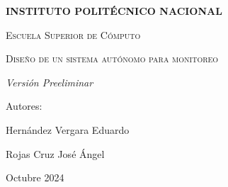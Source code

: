 \begin{titlepage}
\begin{figure}[ht!]
\begin{minipage}{0.2\textwidth}
        \end{minipage}
    \end{figure}
    \centering
    \vspace{1cm}
    {\bfseries\LARGE INSTITUTO POLIT\'ECNICO NACIONAL \par}
    \vspace{1cm}
    {\scshape\Large Escuela Superior de C\'omputo \par}
    \vspace{3cm}
    {\scshape\Huge Dise\~no de un sistema aut\'onomo para monitoreo \par}
    \vspace{3cm}
    {\itshape\Large Versi\'on Preeliminar \par}
    \vfill
    {\Large Autores: \par}
    {\Large Hern\'andez Vergara Eduardo \par}
    {\Large Rojas Cruz Jos\'e \'Angel \par}
    \vfill
    {\Large Octubre 2024 \par}
\end{titlepage}